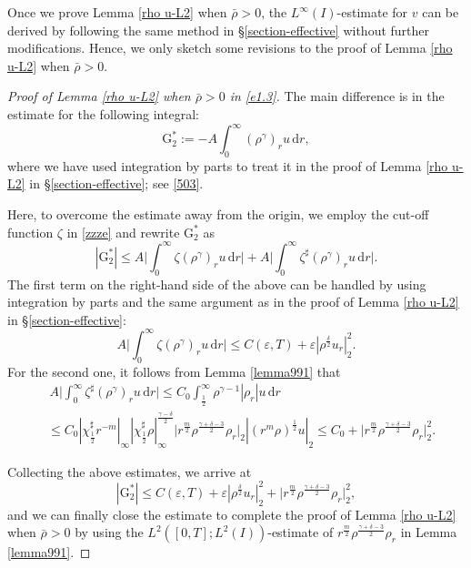 \documentclass[11pt,reqno]{amsart}
\numberwithin{rk}{section}
\numberwithin{prop}{section}
\numberwithin{mydef}{section}
\numberwithin{lem}{section}
\numberwithin{equation}{section}
\numberwithin{thm}{section}
\begin{document}
Once we prove Lemma \ref{rho u-L2} when $\bar{\rho}>0$, the $L^\infty(I)$-estimate for $v$ can be derived by following the same method in \S \ref{section-effective} without further modifications. Hence, we only sketch some revisions to the proof of Lemma \ref{rho u-L2} when $\bar\rho>0$.
\begin{proof}[Proof of Lemma \ref{rho u-L2} when $\bar{\rho}>0$ in \eqref{e1.3}]
The main difference is in the estimate for the following integral:
\begin{equation*}
\mathrm{G}_2^*:=-A\int_0^\infty (\rho^\gamma)_r u\,\mathrm{d}r,
\end{equation*}
where we have used integration by parts to treat it in the proof of Lemma \ref{rho u-L2} in \S \ref{section-effective}; see \eqref{503}.

Here, to overcome the estimate away from the origin, we employ the cut-off function $\zeta$ in \eqref{zzze} and rewrite $\mathrm{G}_2^*$ as
\begin{equation*}
|\mathrm{G}_2^* |\le A\Big|\int_0^\infty \zeta(\rho^\gamma)_r u\,\mathrm{d}r\Big|+A\Big|\int_0^\infty \zeta^\sharp (\rho^\gamma)_r u\,\mathrm{d}r\Big|.    
\end{equation*}
The first term on the right-hand side of the above can be handled by using integration by parts and the same argument as in the proof of Lemma \ref{rho u-L2} in \S \ref{section-effective}:
\begin{equation*}
A\Big|\int_0^\infty \zeta(\rho^\gamma)_r u\,\mathrm{d}r\Big|
\leq C(\varepsilon,T)+\varepsilon|\rho^\frac{\delta}{2}u_r|_2^2.
\end{equation*}
For the second one, it follows from Lemma \ref{lemma991} that
\begin{equation*}
\begin{aligned}
&\,A\Big|\int_0^\infty \zeta^\sharp  (\rho^\gamma)_r u\,\mathrm{d}r\Big| 
\leq C_0\int_\frac{1}{2}^\infty  \rho^{\gamma-1}|\rho_r| u\,\mathrm{d}r\\
&\leq C_0|\chi_\frac{1}{2}^\sharp r^{-m}|_\infty|\chi_\frac{1}{2}^\sharp \rho|_\infty^\frac{\gamma-\delta}{2}\big|r^\frac{m}{2}\rho^\frac{\gamma+\delta-3}{2}\rho_r\big|_2|(r^m\rho)^\frac{1}{2}u|_2\leq C_0+\big|r^\frac{m}{2}\rho^\frac{\gamma+\delta-3}{2}\rho_r\big|_2^2.  
\end{aligned}
\end{equation*}

Collecting the above estimates, we arrive at
\begin{equation*}
|\mathrm{G}_2^*|\leq C(\varepsilon,T)+\varepsilon|\rho^\frac{\delta}{2}u_r|_2^2+\big|r^\frac{m}{2}\rho^\frac{\gamma+\delta-3}{2}\rho_r\big|_2^2,
\end{equation*}
and we can finally close the estimate to complete the proof of Lemma \ref{rho u-L2} when $\bar{\rho}>0$ by using the $L^2([0,T];L^2(I))$-estimate of $r^\frac{m}{2}\rho^\frac{\gamma+\delta-3}{2}\rho_r$ in Lemma \ref{lemma991}.
\end{proof}
\end{document}
